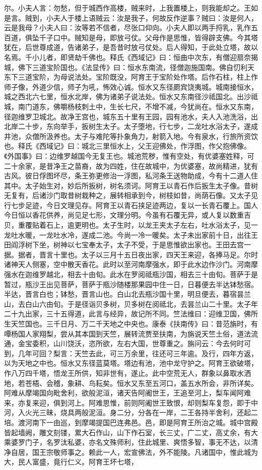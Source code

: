 \documentclass[12pt,UTF8]{ctexbook}
\begin{document}
尔。小夫人言：勿愁，但于城西作高楼，贼来时，上我置楼上，则我能却之。王如是言。贼到，小夫人于楼上语贼云：汝是我子，何故反作逆事？贼曰：汝是何人，云是我母？小夫人曰：汝等若不信者，尽张口仰向。小夫人即以两手捋乳，乳作五百道，俱坠千子口中。贼知是母，即放弓仗。父母作是思惟，皆得辟支佛。今其塔犹在，后世尊成道，告诸弟子，是吾昔时放弓仗处。后人得知，于此处立塔，故以名焉。千小儿者，即贤劫千佛也。释氏《西域记》曰：恒曲中次东，有僧迎扇奈揭城，佛下三道宝阶国也。《法显传》曰：恒水东南流，径僧迦施国南。佛自忉利天东下三道宝阶，为母说法处。宝阶既没，阿育王于宝阶处作塔。后作石柱，柱上作师子像，外道少信，师子为吼，怖效心诚。恒水又东径罽宾饶夷城。城南接恒水，城之西北六七里，恒水北岸，佛为诸弟子说法处。恒水又东南径沙祗国北。出沙祗城，南门道东，佛嚼杨枝刺土中，生长七尺，不增不减，今犹尚在。恒水又东南，径迦维罗卫城北。故净王宫也，城东五十里有王园，园有池水，夫人入池洗浴，出北岸二十步，东向举手，扳树生太子。太子堕地，行七步，二龙吐水浴太子，遂成井池，众僧所汲养也。太子与难陀等扑象角力，射箭入地。今有泉水，行旅所资饮也。释氏《西域记》曰：城北三里恒水上，父王迎佛处，作浮图，作父抱佛像。《外国事》曰：边维罗越国今无复王也。城池荒秽，惟有空处，有优婆塞姓释，可二十余家，是昔净王之苗裔，故为四姓，住在故城中，为优婆塞，故尚精进，犹有古风。彼日俘图坏尽，条王弥更修治一浮图，私河条王送物助成，今有十二道人住其中。太子始生对，妙后所扳树，树名须诃。阿育王以青石作后扳生太子像。昔树无复有，后诸沙门取昔树栽种之，展转相承到今，树枝如昔，尚荫石像。又太子见行七步足迹，今日文理见存。阿育王以青石挟足迹两边，复以一长青石覆上。国人今日恒以香花供养，尚见足七形，文理分明。今虽有石覆无异，或人复以数重吉贝，重覆贴着石上，逾更明也。太子生时，以龙王夹太子左右，吐水浴太子，见一龙吐水暖，一龙吐水冷，遂成二池。今尚一冷一暖矣。太子未出家前十日，出往王田阎浮树下坐，树神以七宝奉太子，太子不受，于是思惟欲出家也。王田去宫一据。据者，晋言十里也。太子以三月十五日夜出家，四天王来迎，各捧马足。尔时诸神天人侧塞，空中散天香花。此时以至河南摩强水，即于此水边作沙门。河南摩强水在迦维罗越北，相去十由旬。此水在罗阅祗瓶沙国，相去三十由旬。菩萨于是暂过，瓶沙王出见菩萨，菩萨于瓶沙随楼那果园中住一日，日暮便去半达钵愁宿。半达，晋言白也；钵愁，晋言山也。白山北去瓶沙国十里，明旦便去，暮宿昙兰山，去白山六由旬。于是径诣贝多树，贝多树在阅祗北，去昙兰山二十里。太子年二十九出家，三十五得道，此言与经异，故记所不同。竺法维曰：迎维卫国，佛所生天竺国也。三千日月、万二千天地之中央也。康泰《扶南传》曰：昔范旃时，有嘾杨国人家翔梨，尝从其本国到天竺，展转流贾至扶南，为旃说天竺土俗，道法流通，金宝委积，山川饶沃，恣所欲，左右大国，世尊重之。旃问云：今去何时可到，几年可回？梨言：天竺去此，可三万余里，往还可三年逾。及行，四年方返，以为天地之中也。恒水又东径蓝莫塔。塔边有池，池中龙守护之。阿育王欲破塔，作八万四千塔，悟龙王所供，知非世有，遂止。此中空荒无人，群象以鼻取水洒地，若苍梧、会稽，象耕、鸟耘矣。恒水又东至五河口，盖五水所会，非所详矣。阿难从摩竭国向毗舍利，欲般泥洹，诸天告阿阇世王，王追至河上，梨车闻阿难来，亦复来迎，俱到河上。阿难思惟，前则阿阇世王致恨，却则梨车复怨，即于中河，入火光三昧，烧具两般泥洹。身二分，分各在一岸，二王各持半舍利，还起二培。渡河南下一由巡，到摩竭提国巴连弗邑。邑，即是阿育王所治之城。城中宫殿皆起墙阙，雕文刻镂，累大石作山，山下作石室，长三丈，广二丈，高丈余，有大乘婆罗门子，名罗汰私婆，亦名文殊师利，住此城里、爽悟多智，事无不达，以清净自居，国王宗敬师事之。赖此一人，宏宣佛法，外不能陵。凡诸国中，惟此城为大，民人富盛，竟行仁义。阿育王坏七塔，
\end{document}
